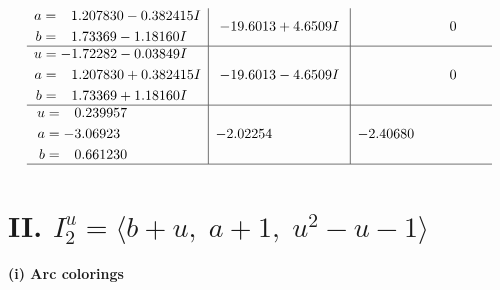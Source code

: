 \documentclass[1p]{elsarticle_modified}
\theoremstyle{definition}
\begin{document}
$$\begin{array}{c|c|c}
\begin{aligned}
a &= \phantom{-}1.207830 - 0.382415 I \\
b &= \phantom{-}1.73369 - 1.18160 I\end{aligned}
 & -19.6013 + 4.6509 I & \phantom{-0.000000 } 0 \\ \hline\begin{aligned}
u &= -1.72282 - 0.03849 I \\
a &= \phantom{-}1.207830 + 0.382415 I \\
b &= \phantom{-}1.73369 + 1.18160 I\end{aligned}
 & -19.6013 - 4.6509 I & \phantom{-0.000000 } 0 \\ \hline\begin{aligned}
u &= \phantom{-}0.239957\phantom{ +0.000000I} \\
a &= -3.06923\phantom{ +0.000000I} \\
b &= \phantom{-}0.661230\phantom{ +0.000000I}\end{aligned}
 & -2.02254\phantom{ +0.000000I} & -2.40680\phantom{ +0.000000I}\\
 \hline 
 \end{array}$$\newpage\newpage\renewcommand{\arraystretch}{1}
\centering \section*{II. $I^u_{2}= \langle b+u,\;a+1,\;u^2- u-1 \rangle$}
\flushleft \textbf{(i) Arc colorings}\\
\end{document}
